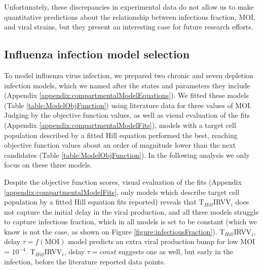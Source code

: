 Unfortunately, these discrepancies in experimental data do not allow us to make quantitative predictions about the relationship between infectious fraction, MOI, and viral strains, but they present an interesting case for future research efforts.

\subsection{Influenza infection model selection}

To model influenza virus infection, we prepared two chronic and seven depletion infection models, which we named after the states and parameters they include (Appendix \ref{appendix:compartmentalModelEquations}). We fitted these models (Table \ref{table:ModelObjFunction}) using literature data \cite{rudiger2019multiscale, frensing2016influenza} for three values of MOI. Judging by the objective function values, as well as visual evaluation of the fits (Appendix \ref{appendix:compartmentalModelFits}), models with a target cell population described by a fitted Hill equation performed the best, reaching objective function values about an order of magnitude lower than the next candidates (Table \ref{table:ModelObjFunction}). In the following analysis we only focus on these three models.

Despite the objective function scores, visual evaluation of the fits (Appendix \ref{appendix:compartmentalModelFits}, only models which describe target cell population by a fitted Hill equation fits reported) reveals that T$_{Hill}$IRVV$_i$ does not capture the initial delay in the viral production, and all three models struggle to capture infectious fraction, which in all models is set to be constant (which we know is not the case, as shown on Figure \ref{figure:infectiousFraction}). T$_{Hill}$IRVV$_i$, delay $\tau = f(\text{MOI})$ model predicts an extra viral production bump for low MOI = $10^{-4}$. T$_{Hill}$IRVV$_i$, delay $\tau = const$ suggests one as well, but early in the infection, before the literature reported data points.

